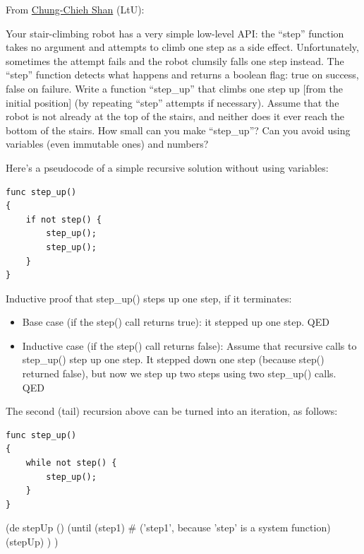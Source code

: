 \begin{itemize}
From \href{http://lambda-the-ultimate.org/node/1872}{Chung-Chieh Shan}
(LtU):

Your stair-climbing robot has a very simple low-level API: the ``step''
function takes no argument and attempts to climb one step as a side
effect. Unfortunately, sometimes the attempt fails and the robot
clumsily falls one step instead. The ``step'' function detects what
happens and returns a boolean flag: true on success, false on failure.
Write a function ``step\_up'' that climbs one step up {[}from the
initial position{]} (by repeating ``step'' attempts if necessary).
Assume that the robot is not already at the top of the stairs, and
neither does it ever reach the bottom of the stairs. How small can you
make ``step\_up''? Can you avoid using variables (even immutable ones)
and numbers?

Here's a pseudocode of a simple recursive solution without using
variables:

\begin{verbatim}
func step_up()
{
    if not step() {
        step_up();
        step_up();
    }
}
\end{verbatim}

Inductive proof that step\_up() steps up one step, if it terminates:

\begin{itemize}
\item
  Base case (if the step() call returns true): it stepped up one step.
  QED
\item
  Inductive case (if the step() call returns false): Assume that
  recursive calls to step\_up() step up one step. It stepped down one
  step (because step() returned false), but now we step up two steps
  using two step\_up() calls. QED
\end{itemize}

The second (tail) recursion above can be turned into an iteration, as
follows:

\begin{verbatim}
func step_up()
{
    while not step() {
        step_up();
    }
}
\end{verbatim}



\begin{wideverbatim}

(de stepUp ()
   (until (step1)  # ('step1', because 'step' is a system function)
      (stepUp) ) )

\end{wideverbatim}


\end{itemize}
